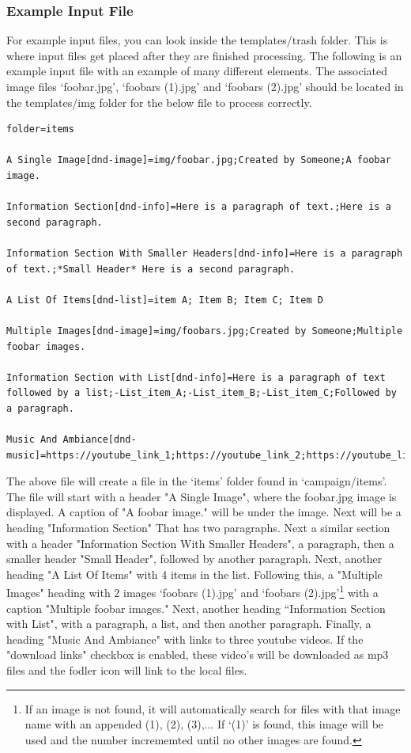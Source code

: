 \subsubsection{Example Input File}

For example input files, you can look inside the templates/trash folder. This is where input files get placed after they are finished processing. The following is an example input file with an example of many different elements. The associated image files `foobar.jpg', `foobars (1).jpg' and `foobars (2).jpg' should be located in the templates/img folder for the below file to process correctly.

\begin{lstlisting}
folder=items

A Single Image[dnd-image]=img/foobar.jpg;Created by Someone;A foobar image.

Information Section[dnd-info]=Here is a paragraph of text.;Here is a second paragraph.

Information Section With Smaller Headers[dnd-info]=Here is a paragraph of text.;*Small Header* Here is a second paragraph.

A List Of Items[dnd-list]=item A; Item B; Item C; Item D

Multiple Images[dnd-image]=img/foobars.jpg;Created by Someone;Multiple foobar images.

Information Section with List[dnd-info]=Here is a paragraph of text followed by a list;-List_item_A;-List_item_B;-List_item_C;Followed by a paragraph.

Music And Ambiance[dnd-music]=https://youtube_link_1;https://youtube_link_2;https://youtube_link_3
\end{lstlisting}

The above file will create a file in the `items' folder found in `campaign/items'. The file will start with a header "A Single Image", where the foobar.jpg image is displayed. A caption of "A foobar image." will be under the image. Next will be a heading "Information Section" That has two paragraphs. Next a similar section with a header "Information Section With Smaller Headers", a paragraph, then a smaller header "Small Header", followed by another paragraph. Next, another heading "A List Of Items" with 4 items in the list. Following this, a "Multiple Images" heading with 2 images `foobars (1).jpg' and `foobars (2).jpg'\footnote{If an image is not found, it will automatically search for files with that image name with an appended (1), (2), (3),... If `(1)' is found, this image will be used and the number incrememted until no other images are found.} with a caption "Multiple foobar images." Next, another heading ``Information Section with List", with a paragraph, a list, and then another paragraph. Finally, a heading "Music And Ambiance" with links to three youtube videos. If the "download links" checkbox is enabled, these video's will be downloaded as mp3 files and the fodler icon will link to the local files.






